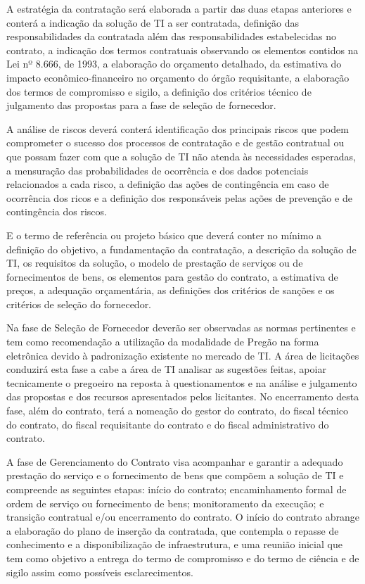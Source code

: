 A estratégia da contratação será elaborada a partir das duas etapas anteriores e conterá a indicação da solução de TI a ser contratada, definição das responsabilidades da contratada além das responsabilidades estabelecidas no contrato, a indicação dos termos contratuais observando os elementos contidos na Lei nº 8.666, de 1993, a elaboração do orçamento detalhado, da estimativa do impacto econômico-financeiro no orçamento do órgão requisitante, a elaboração dos termos de compromisso e sigilo, a definição dos critérios técnico de julgamento das propostas para a fase de seleção de fornecedor. 

A análise de riscos deverá conterá identificação dos principais riscos que podem comprometer o sucesso dos processos de contratação e de gestão contratual ou que possam fazer com que a solução de TI não atenda às necessidades esperadas, a mensuração das probabilidades de ocorrência e dos dados potenciais relacionados a cada risco, a definição das ações de contingência em caso de ocorrência dos ricos e a definição dos responsáveis pelas ações de prevenção e de contingência dos riscos.

E o termo de referência ou projeto básico que deverá conter no mínimo a definição do objetivo, a fundamentação da contratação, a descrição da solução de TI, os requisitos da solução, o modelo de prestação de serviços ou de fornecimentos de bens, os elementos para gestão do contrato, a estimativa de preços, a adequação orçamentária, as definições dos critérios de sanções e os critérios de seleção do fornecedor. 

Na fase de Seleção de Fornecedor deverão ser observadas as normas pertinentes e tem como recomendação a utilização da modalidade de Pregão na forma eletrônica devido à padronização existente no mercado de TI.  A área de licitações conduzirá esta fase a cabe a área de TI analisar as sugestões feitas, apoiar tecnicamente o pregoeiro na reposta à questionamentos e na análise e julgamento das propostas e dos recursos apresentados pelos licitantes. No encerramento desta fase, além do contrato, terá a nomeação do gestor do contrato, do fiscal técnico do contrato, do fiscal requisitante do contrato e do fiscal administrativo do contrato.


A fase de Gerenciamento do Contrato visa acompanhar e garantir a adequado prestação do serviço e o fornecimento de bens que compõem a solução de TI e compreende as seguintes etapas: início do contrato; encaminhamento formal de ordem de serviço ou fornecimento de bens; monitoramento da execução; e transição contratual e/ou encerramento do contrato. O início do contrato abrange a elaboração do plano de inserção da contratada, que contempla o repasse de conhecimento e a disponibilização de infraestrutura, e uma reunião inicial que tem como objetivo a entrega do termo de compromisso e do termo de ciência e de sigilo assim como possíveis esclarecimentos. 

